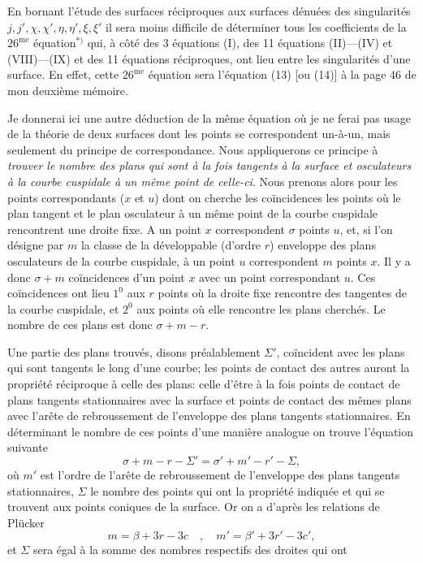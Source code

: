 \documentclass{article}
\begin{document}
En bornant l'étude des surfaces réciproques aux surfaces dénuées des singularités $j, j', \chi, \chi', \eta, \eta', \xi, \xi'$ il sera moins difficile de déterminer tous les coefficients de la $26^{\text{me}}$ équation${}^{*)}$ qui, à côté des 3 équations (I), des 11 équations (II)---(IV) et (VIII)---(IX) et des 11 équations réciproques, ont lieu entre les singularités d'une surface. En effet, cette $26^{\text{me}}$ équation sera l'équation (13) [ou (14)] à la page 46 de mon deuxième mémoire.

Je donnerai ici une autre déduction de la même équation où je ne ferai pas usage de la théorie de deux surfaces dont les points se correspondent un-à-un, mais seulement du principe de correspondance. Nous appliquerons ce principe à \emph{trouver le nombre des plans qui sont à la fois tangents à la surface et osculateurs à la courbe cuspidale à un même point de celle-ci}. Nous prenons alors pour les points correspondants ($x$ et $u$) dont on cherche les coïncidences les points où le plan tangent et le plan osculateur à un même point de la courbe cuspidale rencontrent une droite fixe. A un point $x$ correspondent $\sigma$ points $u$, et, si l'on désigne par $m$ la classe de la développable (d'ordre $r$) enveloppe des plans osculateurs de la courbe cuspidale, à un point $u$ correspondent $m$ points $x$. Il y a donc $\sigma + m$ coïncidences d'un point $x$ avec un point correspondant $u$. Ces coïncidences ont lieu $1^0$ aux $r$ points où la droite fixe rencontre des tangentes de la courbe cuspidale, et $2^0$ aux points où elle rencontre les plans cherchés. Le nombre de ces plans est donc $\sigma + m - r$.

Une partie des plans trouvés, disons préalablement $\Sigma'$, coïncident avec les plans qui sont tangents le long d'une courbe; les points de contact des autres auront la propriété réciproque à celle des plans: celle d'être à la fois points de contact de plans tangents stationnaires avec la surface et points de contact des mêmes plans avec l'arête de rebroussement de l'enveloppe des plans tangents stationnaires. En déterminant le nombre de ces points d'une manière analogue on trouve l'équation suivante
\[
\sigma + m - r - \Sigma' = \sigma' + m' - r' - \Sigma,
\]
où $m'$ est l'ordre de l'arête de rebroussement de l'enveloppe des plans tangents stationnaires, $\Sigma$ le nombre des points qui ont la propriété indiquée et qui se trouvent aux points coniques de la surface. Or on a d'après les relations de Plücker
\[
m = \beta + 3r - 3c \quad , \quad m' = \beta' + 3r' - 3c',
\]
et $\Sigma$ sera égal à la somme des nombres respectifs des droites qui ont
\end{document}
